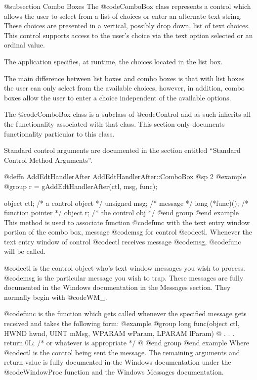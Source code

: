 {@subsection Combo Boxes
The @code{ComboBox} class represents a control which allows the user to
select from a list of choices or enter an alternate text string.  These
choices are presented in a vertical, possibly drop down, list of text
choices.  This control supports access to the user's choice via the text
option selected or an ordinal value.

The application specifies, at runtime, the choices located in the list box.

The main difference between list boxes and combo boxes is that with list
boxes the user can only select from the available choices, however, in
addition, combo boxes allow the user to enter a choice independent of
the available options.

The @code{ComboBox} class is a subclass of @code{Control} and as such
inherits all the functionality associated with that class.  This section
only documents functionality particular to this class.

Standard control arguments are documented in the section entitled
``Standard Control Method Arguments''.










@deffn {AddEdtHandlerAfter} AddEdtHandlerAfter::ComboBox
@sp 2
@example
@group
r = gAddEdtHandlerAfter(ctl, msg, func);

object   ctl;      /*  a control object  */
unsigned msg;      /*  message           */
long    (*func)(); /*  function pointer  */
object  r;         /*  the control obj   */
@end group
@end example
This method is used to associate function @code{func} with the text
entry window portion of the combo box, message @code{msg} for
control @code{ctl}.  Whenever the text entry window of control
@code{ctl} receives message @code{msg}, @code{func} will be called.

@code{ctl} is the control object who's text window messages you wish to
process.  @code{msg} is the particular message you wish to trap.  These
messages are fully documented in the Windows documentation in the
Messages section.  They normally begin with @code{WM_}.

@code{func} is the function which gets called whenever the specified
message gets received and takes the following form:
@example
@group
long    func(object     ctl,
             HWND       hwnd, 
             UINT       mMsg, 
             WPARAM     wParam, 
             LPARAM     lParam)
@{
        .
        .
        .
        return 0L;  /* or whatever is appropriate  */
@}
@end group
@end example
Where @code{ctl} is the control being sent the message.  The remaining
arguments and return value is fully documented in the Windows documentation
under the @code{WindowProc} function and the Windows Messages documentation.

}
